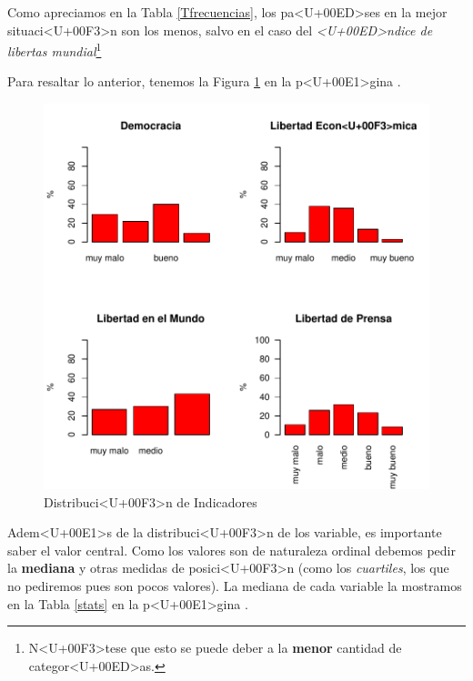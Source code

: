 \documentclass{article}
\begin{document}
Como apreciamos en la Tabla \ref{Tfrecuencias}, los pa<U+00ED>ses en la mejor situaci<U+00F3>n son los menos, salvo en el caso del \emph{<U+00ED>ndice de libertas mundial}\footnote{N<U+00F3>tese que esto se puede deber a la {\bf menor} cantidad de categor<U+00ED>as.}

\clearpage

Para resaltar lo anterior, tenemos la Figura \ref{barplots} en la p<U+00E1>gina \pageref{barplots}. 


\begin{figure}[h]
\centering
\includegraphics{paperVersion_6AMR-barplots}
\caption{Distribuci<U+00F3>n de Indicadores}
\label{barplots}
\end{figure}

Adem<U+00E1>s de la distribuci<U+00F3>n de los variable, es importante saber el valor central. Como los valores son de naturaleza ordinal debemos pedir la {\bf mediana} y otras medidas de posici<U+00F3>n (como los \emph{cuartiles}, los que no pediremos pues son pocos valores). La mediana de cada variable la mostramos en la Tabla \ref{stats} en la p<U+00E1>gina \pageref{stats}.
\end{document}
